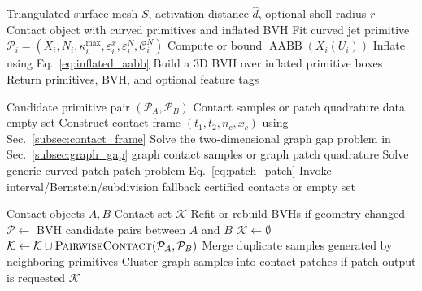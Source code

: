 \documentclass[preprint,12pt]{elsarticle}
\newcommand{\Cc}{\mathcal{C}}
\newcommand{\Pc}{\mathcal{P}}
\newcommand{\eps}{\varepsilon}
\newcommand{\method}{\textsc{CALG-Contact}}
\begin{document}
\begin{algorithm}[t]
\caption{Preprocessing for \method{}}
\label{alg:preprocess}
\begin{algorithmic}[1]
\Require Triangulated surface mesh $S$, activation distance $\hat d$, optional shell radius $r$
\Ensure Contact object with curved primitives and inflated BVH
    \State Fit curved jet primitive $\Pc_i=(X_i,N_i,\kappa_i^{\max},\eps_i^x,\eps_i^N,\Cc_i^N)$
    \State Compute or bound $\operatorname{AABB}(X_i(U_i))$
    \State Inflate using Eq.~\eqref{eq:inflated_aabb}
\EndFor
\State Build a 3D BVH over inflated primitive boxes
\State Return primitives, BVH, and optional feature tags
\end{algorithmic}
\end{algorithm}

\begin{algorithm}[t]
\caption{Pairwise contact query}
\label{alg:pair_query}
\begin{algorithmic}[1]
\Require Candidate primitive pair $(\Pc_A,\Pc_B)$
\Ensure Contact samples or patch quadrature data
    \State \Return empty set
\EndIf
\State Construct contact frame $(t_1,t_2,n_c,x_c)$ using Sec.~\ref{subsec:contact_frame}
    \State Solve the two-dimensional graph gap problem in Sec.~\ref{subsec:graph_gap}
        \State \Return graph contact samples or graph patch quadrature
    \EndIf
\EndIf
\State Solve generic curved patch-patch problem Eq.~\eqref{eq:patch_patch}
    \State Invoke interval/Bernstein/subdivision fallback
\EndIf
\State \Return certified contacts or empty set
\end{algorithmic}
\end{algorithm}

\begin{algorithm}[t]
\caption{Global contact detection}
\label{alg:global}
\begin{algorithmic}[1]
\Require Contact objects $A,B$
\Ensure Contact set $\mathcal{K}$
\State Refit or rebuild BVHs if geometry changed
\State $\mathcal{P}\gets$ BVH candidate pairs between $A$ and $B$
\State $\mathcal{K}\gets\emptyset$
\For{each $(\Pc_A,\Pc_B)\in\mathcal{P}$}
    \State $\mathcal{K}\gets \mathcal{K}\cup \textsc{PairwiseContact}(\Pc_A,\Pc_B)$
\EndFor
\State Merge duplicate samples generated by neighboring primitives
\State Cluster graph samples into contact patches if patch output is requested
\State \Return $\mathcal{K}$
\end{algorithmic}
\end{algorithm}
\end{document}
